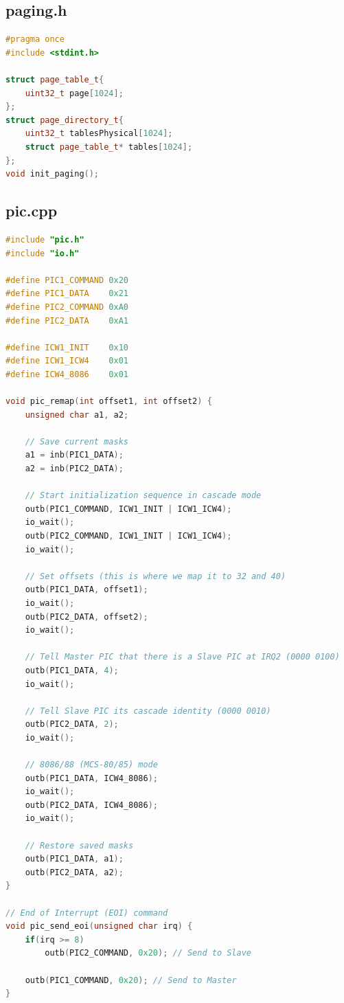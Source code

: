 \documentclass[12pt,a4paper]{report}
\begin{document}
\subsection{paging.h}
\begin{lstlisting}[language={C++}]
#pragma once
#include <stdint.h>

struct page_table_t{
    uint32_t page[1024];
};
struct page_directory_t{
    uint32_t tablesPhysical[1024];
    struct page_table_t* tables[1024];
};
void init_paging();
\end{lstlisting}

\subsection{pic.cpp}
\begin{lstlisting}[language={C++}]
#include "pic.h"
#include "io.h"

#define PIC1_COMMAND 0x20
#define PIC1_DATA    0x21
#define PIC2_COMMAND 0xA0
#define PIC2_DATA    0xA1

#define ICW1_INIT    0x10
#define ICW1_ICW4    0x01
#define ICW4_8086    0x01

void pic_remap(int offset1, int offset2) {
    unsigned char a1, a2;
    
    // Save current masks
    a1 = inb(PIC1_DATA);
    a2 = inb(PIC2_DATA);
    
    // Start initialization sequence in cascade mode
    outb(PIC1_COMMAND, ICW1_INIT | ICW1_ICW4);
    io_wait();
    outb(PIC2_COMMAND, ICW1_INIT | ICW1_ICW4);
    io_wait();
    
    // Set offsets (this is where we map it to 32 and 40)
    outb(PIC1_DATA, offset1);
    io_wait();
    outb(PIC2_DATA, offset2);
    io_wait();
    
    // Tell Master PIC that there is a Slave PIC at IRQ2 (0000 0100)
    outb(PIC1_DATA, 4);
    io_wait();
    
    // Tell Slave PIC its cascade identity (0000 0010)
    outb(PIC2_DATA, 2);
    io_wait();
    
    // 8086/88 (MCS-80/85) mode
    outb(PIC1_DATA, ICW4_8086);
    io_wait();
    outb(PIC2_DATA, ICW4_8086);
    io_wait();
    
    // Restore saved masks
    outb(PIC1_DATA, a1);
    outb(PIC2_DATA, a2);
}

// End of Interrupt (EOI) command
void pic_send_eoi(unsigned char irq) {
    if(irq >= 8)
        outb(PIC2_COMMAND, 0x20); // Send to Slave
    
    outb(PIC1_COMMAND, 0x20); // Send to Master
}

\end{lstlisting}
\end{document}
